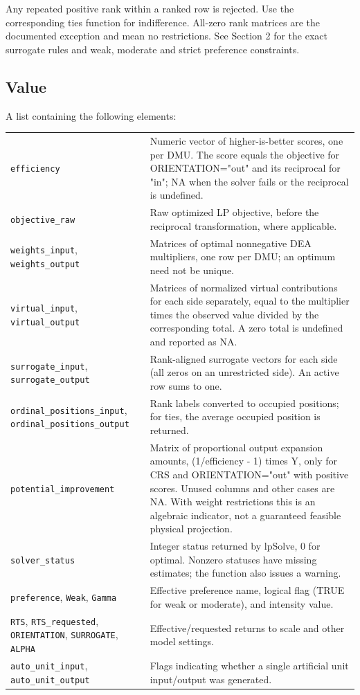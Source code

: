 \documentclass[10pt,a4paper]{article}
\newcommand{\field}[1]{\needspace{3\baselineskip}\subsection*{#1}}
\begin{document}
Any repeated positive rank within a ranked row is rejected. Use the corresponding ties function for indifference. All-zero rank matrices are the documented exception and mean no restrictions.
See Section 2 for the exact surrogate rules and weak, moderate and strict preference constraints.
\field{Value}
A list containing the following elements:
\begin{longtable}{@{}p{53mm}p{106mm}@{}}
\texttt{efficiency} & Numeric vector of higher-is-better scores, one per DMU. The score equals the objective for ORIENTATION="out" and its reciprocal for "in"; NA when the solver fails or the reciprocal is undefined. \\[2pt]
\texttt{objective\_raw} & Raw optimized LP objective, before the reciprocal transformation, where applicable. \\[2pt]
\texttt{weights\_input}, \texttt{weights\_output} & Matrices of optimal nonnegative DEA multipliers, one row per DMU; an optimum need not be unique. \\[2pt]
\texttt{virtual\_input}, \texttt{virtual\_output} & Matrices of normalized virtual contributions for each side separately, equal to the multiplier times the observed value divided by the corresponding total. A zero total is undefined and reported as NA. \\[2pt]
\texttt{surrogate\_input}, \texttt{surrogate\_output} & Rank-aligned surrogate vectors for each side (all zeros on an unrestricted side). An active row sums to one. \\[2pt]
\texttt{ordinal\_positions\_input}, \texttt{ordinal\_positions\_output} & Rank labels converted to occupied positions; for ties, the average occupied position is returned. \\[2pt]
\texttt{potential\_improvement} & Matrix of proportional output expansion amounts, (1/efficiency - 1) times Y, only for CRS and ORIENTATION="out" with positive scores. Unused columns and other cases are NA. With weight restrictions this is an algebraic indicator, not a guaranteed feasible physical projection. \\[2pt]
\texttt{solver\_status} & Integer status returned by lpSolve, 0 for optimal. Nonzero statuses have missing estimates; the function also issues a warning. \\[2pt]
\texttt{preference}, \texttt{Weak}, \texttt{Gamma} & Effective preference name, logical flag (TRUE for weak or moderate), and intensity value. \\[2pt]
\texttt{RTS}, \texttt{RTS\_requested}, \texttt{ORIENTATION}, \texttt{SURROGATE}, \texttt{ALPHA} & Effective/requested returns to scale and other model settings. \\[2pt]
\texttt{auto\_unit\_input}, \texttt{auto\_unit\_output} & Flags indicating whether a single artificial unit input/output was generated. \\[2pt]
\end{longtable}
\end{document}
